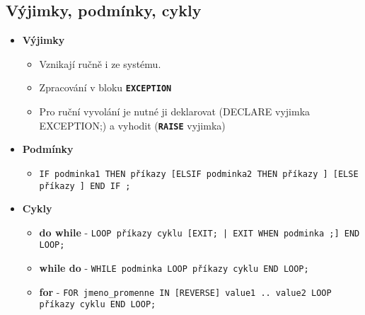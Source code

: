 \subsection{Výjimky, podmínky, cykly}
\begin{itemize}
    \item \textbf{Výjimky}
          \begin{itemize}
              \item Vznikají ručně i ze systému.
              \item Zpracování v bloku \texttt{\textbf{EXCEPTION}}
              \item Pro ruční vyvolání je nutné ji deklarovat (DECLARE vyjimka EXCEPTION;) a vyhodit (\textbf{\texttt{RAISE}} vyjimka)
          \end{itemize}
    \item \textbf{Podmínky}
          \begin{itemize}
              \item \texttt{IF podminka1 THEN příkazy [ELSIF podminka2 THEN příkazy ] [ELSE příkazy ] END IF ;}
          \end{itemize}
    \item \textbf{Cykly}
          \begin{itemize}
              \item \textbf{do while} - \texttt{LOOP příkazy cyklu [EXIT; | EXIT WHEN podminka ;] END LOOP;}
              \item \textbf{while do} - \texttt{WHILE podminka LOOP příkazy cyklu END LOOP;}
              \item \textbf{for} - \texttt{FOR jmeno\_promenne IN [REVERSE] value1 .. value2 LOOP příkazy cyklu END LOOP;}
          \end{itemize}
\end{itemize}


